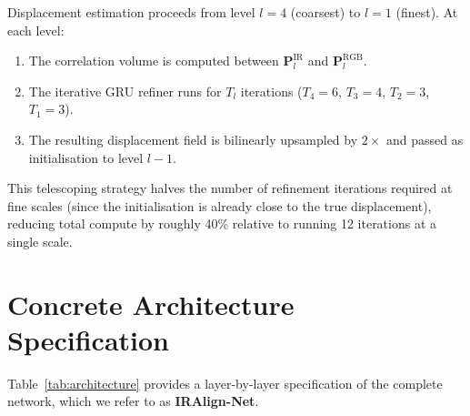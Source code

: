 Displacement estimation proceeds from level $l{=}4$ (coarsest) to
$l{=}1$ (finest).  At each level:
\begin{enumerate}
  \item The correlation volume is computed between
        $\mathbf{P}_l^{\mathrm{IR}}$ and $\mathbf{P}_l^{\mathrm{RGB}}$.
  \item The iterative GRU refiner runs for $T_l$ iterations
        ($T_4{=}6$, $T_3{=}4$, $T_2{=}3$, $T_1{=}3$).
  \item The resulting displacement field is bilinearly upsampled by
        $2\times$ and passed as initialisation to level $l{-}1$.
\end{enumerate}
This telescoping strategy halves the number of refinement iterations
required at fine scales (since the initialisation is already close to the
true displacement), reducing total compute by roughly 40\% relative to
running 12 iterations at a single scale.

\section{Concrete Architecture Specification}
\label{sec:arch_spec}

Table~\ref{tab:architecture} provides a layer-by-layer specification of
the complete network, which we refer to as \textbf{IRAlign-Net}.

